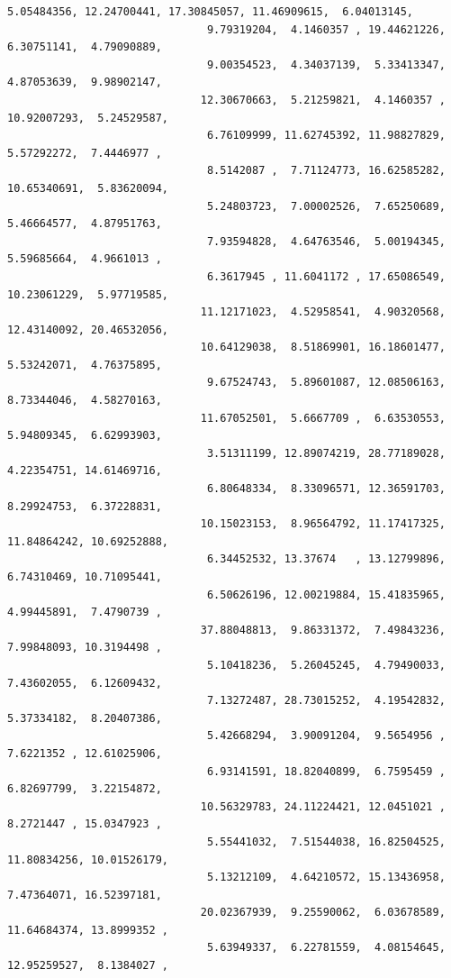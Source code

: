 \documentclass[11pt]{article}
\begin{document}
\begin{Verbatim}[commandchars=\\\{\}]
                               5.05484356, 12.24700441, 17.30845057, 11.46909615,  6.04013145,
                               9.79319204,  4.1460357 , 19.44621226,  6.30751141,  4.79090889,
                               9.00354523,  4.34037139,  5.33413347,  4.87053639,  9.98902147,
                              12.30670663,  5.21259821,  4.1460357 , 10.92007293,  5.24529587,
                               6.76109999, 11.62745392, 11.98827829,  5.57292272,  7.4446977 ,
                               8.5142087 ,  7.71124773, 16.62585282, 10.65340691,  5.83620094,
                               5.24803723,  7.00002526,  7.65250689,  5.46664577,  4.87951763,
                               7.93594828,  4.64763546,  5.00194345,  5.59685664,  4.9661013 ,
                               6.3617945 , 11.6041172 , 17.65086549, 10.23061229,  5.97719585,
                              11.12171023,  4.52958541,  4.90320568, 12.43140092, 20.46532056,
                              10.64129038,  8.51869901, 16.18601477,  5.53242071,  4.76375895,
                               9.67524743,  5.89601087, 12.08506163,  8.73344046,  4.58270163,
                              11.67052501,  5.6667709 ,  6.63530553,  5.94809345,  6.62993903,
                               3.51311199, 12.89074219, 28.77189028,  4.22354751, 14.61469716,
                               6.80648334,  8.33096571, 12.36591703,  8.29924753,  6.37228831,
                              10.15023153,  8.96564792, 11.17417325, 11.84864242, 10.69252888,
                               6.34452532, 13.37674   , 13.12799896,  6.74310469, 10.71095441,
                               6.50626196, 12.00219884, 15.41835965,  4.99445891,  7.4790739 ,
                              37.88048813,  9.86331372,  7.49843236,  7.99848093, 10.3194498 ,
                               5.10418236,  5.26045245,  4.79490033,  7.43602055,  6.12609432,
                               7.13272487, 28.73015252,  4.19542832,  5.37334182,  8.20407386,
                               5.42668294,  3.90091204,  9.5654956 ,  7.6221352 , 12.61025906,
                               6.93141591, 18.82040899,  6.7595459 ,  6.82697799,  3.22154872,
                              10.56329783, 24.11224421, 12.0451021 ,  8.2721447 , 15.0347923 ,
                               5.55441032,  7.51544038, 16.82504525, 11.80834256, 10.01526179,
                               5.13212109,  4.64210572, 15.13436958,  7.47364071, 16.52397181,
                              20.02367939,  9.25590062,  6.03678589, 11.64684374, 13.8999352 ,
                               5.63949337,  6.22781559,  4.08154645, 12.95259527,  8.1384027 ,

\end{Verbatim}
\end{document}
